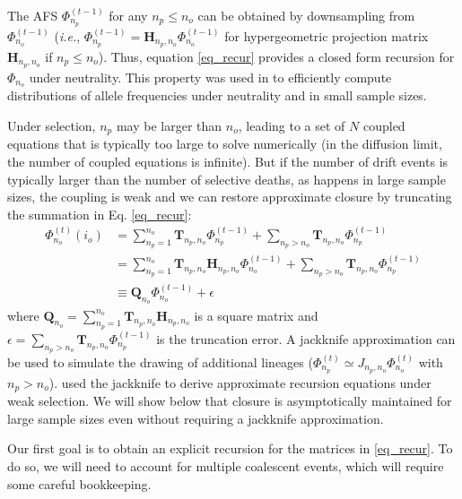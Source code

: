 \documentclass[review]{elsarticle}
\newcommand{\afs}[2]{\Phi_{#1}^{(#2)}}
\begin{document}
The AFS  $\afs{n_p}{t-1}$ for any  $n_p\leq n_o$ can be obtained by downsampling from $\afs{n_o}{t-1}$ (\textit{i.e.}, $\afs{n_p}{t-1} =
\mathbf{H}_{n_p,n_o} \afs{n_o}{t-1}$ for hypergeometric projection matrix $\mathbf{H}_{n_p,n_o}$ if
$n_p\leq n_o$). Thus, equation \eqref{eq_recur} provides a closed form recursion for $\Phi_{n_o}$ under neutrality.
This property was used in \cite{JouganousEtAl2017} to efficiently compute distributions of allele
frequencies under neutrality and in small sample sizes.

Under selection, $n_{p}$ may be larger than $n_o$, leading to a set of $N$ coupled equations that is
typically too large to solve numerically (in the diffusion limit, the number of coupled equations is
infinite). But if the number of drift events is typically larger than the number of selective
deaths, as happens in large sample sizes, the coupling is weak and we can restore approximate
closure by truncating the summation in Eq. \ref{eq_recur}:
\begin{equation}
\begin{split}
  \afs{n_o}{t}(i_o)
  &= \sum_{n_p=1}^{n_{o}} \mathbf{T}_{n_p,n_o}  \afs{n_p}{t-1}+ \sum_{n_p> n_o }  \mathbf{T}_{n_p,n_o} \afs{n_p}{t-1} \\
  &=      \sum_{n_p=1}^{n_{o}} \mathbf{T}_{n_p,n_o} \mathbf{H}_{n_p,n_o} \afs{n_o}{t-1}+ \sum_{n_p> n_o }  \mathbf{T}_{n_p,n_o} \afs{n_p}{t-1} \\
  &\equiv \mathbf{Q}_{n_o}                                               \afs{n_o}{t-1}+\epsilon
\end{split}
\label{eq_truncated}
\end{equation}
where $\mathbf{Q}_{n_o} =  \sum_{n_p=1}^{n_{o}} \mathbf{T}_{n_p,n_o} \mathbf{H}_{n_p,n_o}$ is a square matrix
and $\epsilon =  \sum_{n_p> n_o }  \mathbf{T}_{n_p,n_o} \afs{n_p}{t-1}$ is the truncation error. 
A jackknife approximation \citep{Gravel2016} can be used to simulate the drawing of additional lineages
($\afs{n_p}{t} \simeq J_{n_p,n_o} \afs{n_o}{t}$ with $n_p>n_o$). \cite{JouganousEtAl2017} used the
jackknife to derive approximate recursion equations under weak selection. We will show below that
closure is asymptotically maintained for large sample sizes even without requiring a jackknife
approximation.

Our first goal is to obtain an explicit recursion for the matrices in \eqref{eq_recur}. To do so, we
will need to account for multiple coalescent events, which will require some careful bookkeeping.
\end{document}
